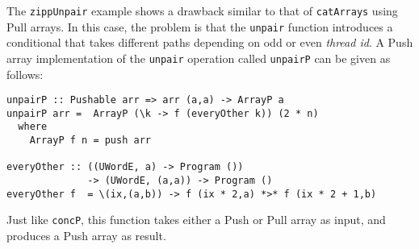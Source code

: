 


%  
%  
%  


The {\tt zippUnpair} example shows a drawback similar to that of {\tt catArrays} using Pull arrays. 
In this case, the problem is that the {\tt unpair} function introduces 
a conditional that takes different paths depending on odd or even {\em thread id}. 
A Push array implementation of the {\tt unpair} operation called {\tt unpairP}
can be given as follows: 

\begin{codesize}
\begin{verbatim}
unpairP :: Pushable arr => arr (a,a) -> ArrayP a 
unpairP arr =  ArrayP (\k -> f (everyOther k)) (2 * n)
  where 
    ArrayP f n = push arr 
    
everyOther :: ((UWordE, a) -> Program ()) 
              -> (UWordE, (a,a)) -> Program ()
everyOther f  = \(ix,(a,b)) -> f (ix * 2,a) *>* f (ix * 2 + 1,b)  
\end{verbatim}
\end{codesize}

\noindent
Just like {\tt concP}, this function takes either a Push or Pull array 
as input, and produces a Push array as result. 

